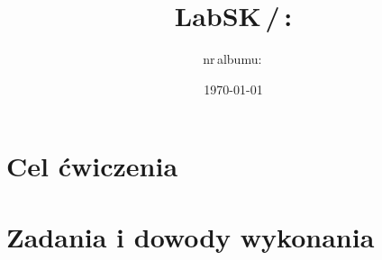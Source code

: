 \documentclass[11pt,a4paper]{article}
\title{LabSK\,/\,\cwiczenie: \temat}
\author{\autor \quad nr\,albumu:\,\album \quad \grupa}
\date{\today}
\begin{document}
\maketitle
\vspace{-1.5em}


\section*{Cel ćwiczenia}

\section*{Zadania i dowody wykonania}
\end{document}
